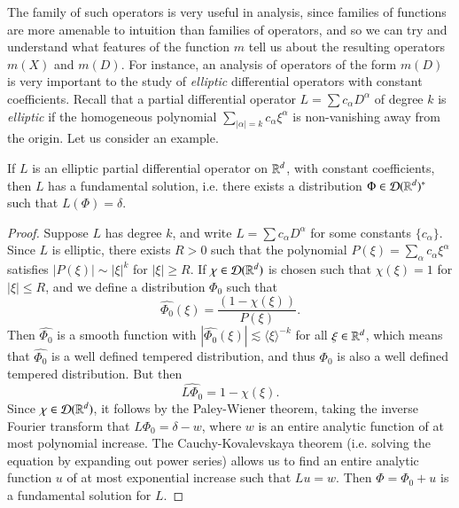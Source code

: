 The family of such operators is very useful in analysis, since families of functions are more amenable to intuition than families of operators, and so we can try and understand what features of the function $m$ tell us about the resulting operators $m(X)$ and $m(D)$. For instance, an analysis of operators of the form $m(D)$ is very important to the study of \emph{elliptic} differential operators with constant coefficients. Recall that a partial differential operator $L = \sum c_\alpha D^\alpha$ of degree $k$ is \emph{elliptic} if the homogeneous polynomial $\sum_{|\alpha| = k} c_\alpha \xi^\alpha$ is non-vanishing away from the origin. Let us consider an example.

\begin{theorem}
    If $L$ is an elliptic partial differential operator on $\operatorname{\mathbb{R}}^d$, with constant coefficients, then $L$ has a fundamental solution, i.e. there exists a distribution $\Phi \in \operatorname{\mathcal{D}}(\operatorname{\mathbb{R}}^d)^*$ such that $L(\Phi) = \delta$.
\end{theorem}
\begin{proof}
    Suppose $L$ has degree $k$, and write $L = \sum c_\alpha D^\alpha$ for some constants $\{ c_\alpha \}$. Since $L$ is elliptic, there exists $R > 0$ such that the polynomial $P(\xi) = \sum_\alpha c_\alpha \xi^\alpha$ satisfies $|P(\xi)| \sim |\xi|^k$ for $|\xi| \geq R$. If $\chi \in \operatorname{\mathcal{D}}(\operatorname{\mathbb{R}}^d)$ is chosen such that $\chi(\xi) = 1$ for $|\xi| \leq R$, and we define a distribution $\Phi_0$ such that
    \[ \widehat{\Phi_0}(\xi) = \frac{(1 - \chi(\xi))}{P(\xi)}. \]
    Then $\widehat{\Phi_0}$ is a smooth function with $|\widehat{\Phi_0}(\xi)| \lesssim \langle \xi \rangle^{-k}$ for all $\xi \in \operatorname{\mathbb{R}}^d$, which means that $\widehat{\Phi_0}$ is a well defined tempered distribution, and thus $\Phi_0$ is also a well defined tempered distribution. But then
    \[ \widehat{L \Phi_0} = 1 - \chi(\xi). \]
    Since $\chi \in \operatorname{\mathcal{D}}(\operatorname{\mathbb{R}}^d)$, it follows by the Paley-Wiener theorem, taking the inverse Fourier transform that $L \Phi_0 = \delta - w$, where $w$ is an entire analytic function of at most polynomial increase. The Cauchy-Kovalevskaya theorem (i.e. solving the equation by expanding out power series) allows us to find an entire analytic function $u$ of at most exponential increase such that $Lu = w$. Then $\Phi = \Phi_0 + u$ is a fundamental solution for $L$.
\end{proof}

